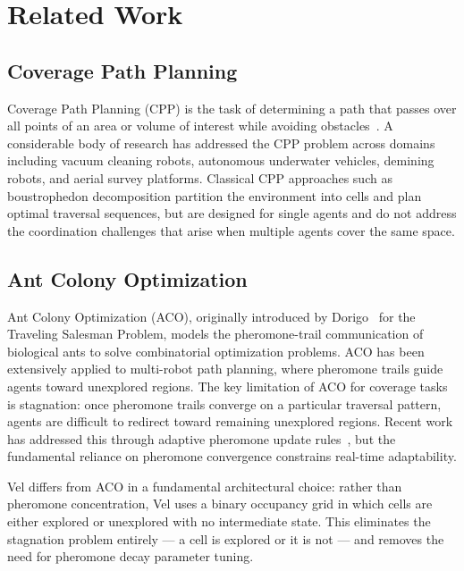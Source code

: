 \documentclass[journal,compsoc]{IEEEtran}
\begin{document}
\section{Related Work}
\label{sec:related}

\subsection{Coverage Path Planning}

Coverage Path Planning (CPP) is the task of determining a path that passes over all
points of an area or volume of interest while avoiding obstacles~\cite{galceran2013}.
A considerable body of research has addressed the CPP problem across domains including
vacuum cleaning robots, autonomous underwater vehicles, demining robots, and aerial
survey platforms. Classical CPP approaches such as boustrophedon decomposition partition
the environment into cells and plan optimal traversal sequences, but are designed for
single agents and do not address the coordination challenges that arise when multiple
agents cover the same space.

\subsection{Ant Colony Optimization}

Ant Colony Optimization (ACO), originally introduced by Dorigo~\cite{dorigo1992} for
the Traveling Salesman Problem, models the pheromone-trail communication of biological
ants to solve combinatorial optimization problems. ACO has been extensively applied to
multi-robot path planning, where pheromone trails guide agents toward unexplored regions.
The key limitation of ACO for coverage tasks is stagnation: once pheromone trails
converge on a particular traversal pattern, agents are difficult to redirect toward
remaining unexplored regions. Recent work has addressed this through adaptive pheromone
update rules~\cite{li2024}, but the fundamental reliance on pheromone convergence
constrains real-time adaptability.

Vel differs from ACO in a fundamental architectural choice: rather than pheromone
concentration, Vel uses a binary occupancy grid in which cells are either explored or
unexplored with no intermediate state. This eliminates the stagnation problem entirely
--- a cell is explored or it is not --- and removes the need for pheromone decay
parameter tuning.
\end{document}
